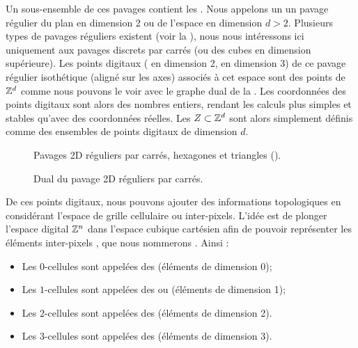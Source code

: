 Un sous-ensemble de ces pavages contient les . Nous
appelons un  un pavage régulier du plan en dimension 2
ou de l'espace en dimension $d > 2$. Plusieurs types de pavages réguliers
existent (voir la ), nous nous intéressons ici uniquement
aux pavages discrets par carrés (ou des cubes en dimension supérieure). Les
points digitaux ( en dimension 2,  en
dimension 3) de ce pavage régulier isothétique (aligné sur les axes)  associés à
cet espace sont des points de $\mathbb{Z}^d$ comme nous pouvons le voir avec le graphe
dual de la . Les coordonnées des points digitaux sont
alors des nombres entiers, rendant les calculs plus simples et stables qu'avec
des coordonnées réelles. Les  $Z \subset \mathbb{Z}^d$
sont alors simplement définis comme des ensembles de points digitaux de
dimension $d$.

\begin{figure}[ht]
  \begin{center}
    
    \caption{Pavages 2D réguliers par carrés, hexagones et triangles ().\label{fig:pavages}}
  \end{center}
\end{figure}

\begin{figure}[ht]
  \begin{center}
    
    \caption{Dual du pavage 2D réguliers par carrés.\label{fig:pavage_dual}}
  \end{center}
\end{figure}

De ces points digitaux, nous pouvons ajouter des informations topologiques en
considérant l'espace de grille cellulaire ou inter-pixels. L'idée est de plonger
l'espace digital $\mathbb{Z}^n$ dans l'espace cubique cartésien afin de pouvoir
représenter les éléments inter-pixels \cite{Kovalesvsky1989, Khalimsky1990,
Francon1991}, que nous nommerons . Ainsi :
%
\begin{itemize}
%
  \item Les $0$-cellules sont appelées des  (éléments
  de dimension 0);
%
  \item Les $1$-cellules sont appelées des  ou
   (éléments de dimension 1);
%
  \item Les $2$-cellules sont appelées des  (éléments de
  dimension 2).
%
  \item Les $3$-cellules sont appelées des  (éléments de
  dimension 3).
%
\end{itemize}

